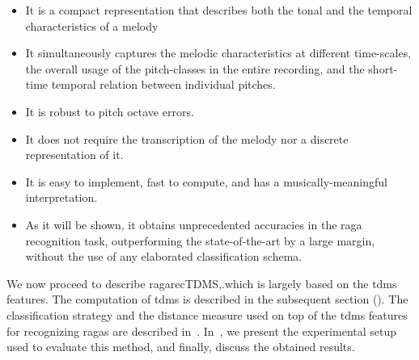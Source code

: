 \begin{itemize}
	\item It is a compact representation that describes both the tonal and the temporal characteristics of a melody
	\item It simultaneously captures the melodic characteristics at different time-scales, the overall usage of the pitch-classes in the entire recording, and the short-time temporal relation between individual pitches.
	\item It is robust to pitch octave errors.
	\item It does not require the transcription of the melody nor a discrete representation of it.
	\item It is easy to implement, fast to compute, and has a musically-meaningful interpretation.
	\item As it will be shown, it obtains unprecedented accuracies in the raga recognition task, outperforming the state-of-the-art by a large margin, without the use of any elaborated classification schema.
\end{itemize}

We now proceed to describe \acrshort{ragarecTDMS},.which is largely based on the \gls{tdms} features. The computation of \gls{tdms} is described in the subsequent section (). The classification strategy and the distance measure used on top of the \gls{tdms} features for recognizing \glspl{raga} are described in~. In~, we present the experimental setup used to evaluate this method, and finally, discuss the obtained results. 

\subsection{}
\label{sec:tdms_feature_extraction}

